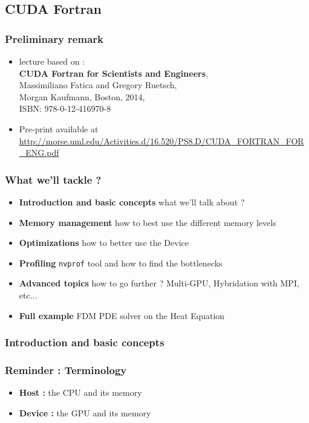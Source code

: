\subsection{CUDA Fortran}

\begin{frame}[containsverbatim]
	\frametitle{Preliminary remark}

	\begin{itemize}
	\item {lecture based on :\\
		\textbf{CUDA Fortran for Scientists and Engineers}, \\
		Massimiliano Fatica and Gregory Ruetsch, \\
		Morgan Kaufmann, Boston, 2014, \\
		ISBN: 978-0-12-416970-8 \\
	}
	\item {Pre-print available at \url{http://morse.uml.edu/Activities.d/16.520/PS8.D/CUDA_FORTRAN_FOR_ENG.pdf}}
	\end{itemize}
\end{frame}

\begin{frame}[containsverbatim]
	\frametitle{What we'll tackle ?}

	\begin{itemize}
	\item {\textbf{Introduction and basic concepts} what we'll talk about ? }
	\item {\textbf{Memory management} how to best use the different memory levels }
	\item {\textbf{Optimizations} how to better use the Device }
	\item {\textbf{Profiling} \texttt{nvprof} tool and how to find the bottlenecks }
	\item {\textbf{Advanced topics} how to go further ? Multi-GPU, Hybridation with MPI, etc... }
	\item {\textbf{Full example} FDM PDE solver on the Heat Equation }
	\end{itemize}
\end{frame}

\subsubsection{Introduction and basic concepts}


\begin{frame}[containsverbatim]
	\frametitle{Reminder : Terminology}
	\begin{itemize}
	\item {\bf Host :} the CPU and its memory
	\item {\bf Device : } the GPU and its memory
	\end{itemize}
\end{frame}


